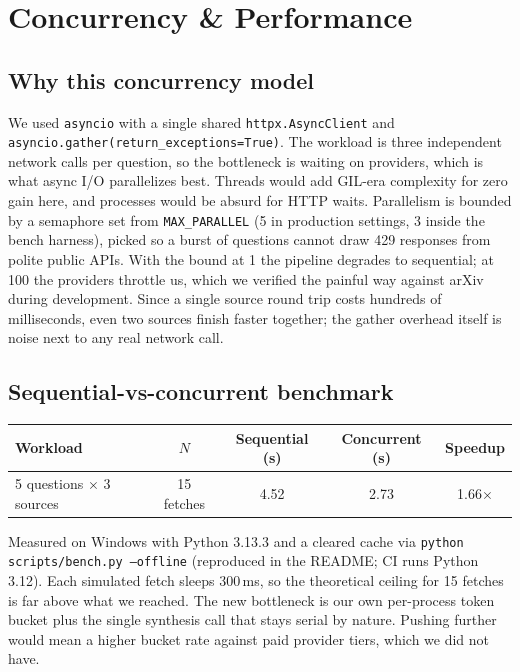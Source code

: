 \documentclass[11pt,a4paper]{article}
\begin{document}
\section{Concurrency \& Performance}\label{sec:concurrency}

\subsection{Why this concurrency model}

We used \texttt{asyncio} with a single shared \texttt{httpx.AsyncClient} and \texttt{asyncio.gather(return\_exceptions=True)}. The workload is three independent network calls per question, so the bottleneck is waiting on providers, which is what async I/O parallelizes best. Threads would add GIL-era complexity for zero gain here, and processes would be absurd for HTTP waits. Parallelism is bounded by a semaphore set from \texttt{MAX\_PARALLEL} (5 in production settings, 3 inside the bench harness), picked so a burst of questions cannot draw 429 responses from polite public APIs. With the bound at 1 the pipeline degrades to sequential; at 100 the providers throttle us, which we verified the painful way against arXiv during development. Since a single source round trip costs hundreds of milliseconds, even two sources finish faster together; the gather overhead itself is noise next to any real network call.

\subsection{Sequential-vs-concurrent benchmark}

\begin{center}\small
\begin{tabular}{lcccc}
\toprule
\textbf{Workload} & $N$ & \textbf{Sequential (s)} & \textbf{Concurrent (s)} & \textbf{Speedup} \\
\midrule
5 questions $\times$ 3 sources & 15 fetches & 4.52 & 2.73 & 1.66$\times$ \\
\bottomrule
\end{tabular}
\end{center}

Measured on Windows with Python 3.13.3 and a cleared cache via \texttt{python scripts/bench.py --offline} (reproduced in the README; CI runs Python 3.12). Each simulated fetch sleeps 300\,ms, so the theoretical ceiling for 15 fetches is far above what we reached. The new bottleneck is our own per-process token bucket plus the single synthesis call that stays serial by nature. Pushing further would mean a higher bucket rate against paid provider tiers, which we did not have.
\end{document}
